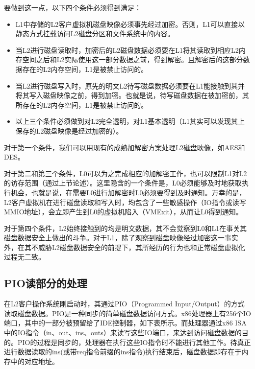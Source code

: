 要做到这一点，以下四个条件必须得到满足：

\begin{itemize}
\item{L1中存储的L2客户虚拟机磁盘映像必须事先经过加密。否则，L1可以直接以静态方式挂载访问L2磁盘分区和文件系统中的内容。}
\item{当L2进行磁盘读取时，加密后的L2磁盘数据必须要在L1将其读取到相应L2内存空间之后和L2实际使用这一部分数据之前，得到解密。且解密后的这部分数据存在的L2内存空间，L1是被禁止访问的。}
\item{当L2进行磁盘写入时，原先的明文L2待写磁盘数据必须要在L1能接触到其并将其写入磁盘映像之前，得到加密。也就是说，待写磁盘数据在被加密前，其所存在的L2内存空间，L1是被禁止访问的。}
\item{以上三个条件必须做到对L2完全透明，对L1基本透明（L1其实可以发现其上保存的L2磁盘映像是经过加密的）。}
\end{itemize}

对于第一个条件，我们可以用现有的成熟加解密方案处理L2磁盘映像，如AES和DES。

对于第二和第三个条件，L0可以为之完成相应的加解密工作，也可以限制L1对L2的访存范围（通过上节论述）。这里隐含的一个条件是，L0必须能够及时地获取执行机会，也就是说，在需要L0进行加解密时L0必须要得到及时通知。万幸的是，L2客户虚拟机在进行磁盘读取和写入时，均包含了一些敏感操作（IO指令或读写MMIO地址），会立即产生到L0的虚拟机陷入（VMExit），从而让L0得到通知。

对于第四个条件，L2始终接触到的均是明文数据，其不会觉察到L0和L1在事关其磁盘数据安全上做出的斗争。对于L1，除了观察到磁盘映像经过加密这一事实外，在其不威胁L2磁盘数据安全的前提下，其所经历的行为也和正常磁盘虚拟化过程无二致。


\subsection{PIO读部分的处理}

在L2客户操作系统刚启动时，其通过PIO（Programmed Input/Output）的方式读取磁盘数据。PIO是一种同步的简单磁盘数据访问方式。x86处理器上有256个IO端口，其中的一部分被预留给了IDE控制器，如下表所示。而处理器通过x86 ISA中的IO指令（in、out、ins、outs）来读写这些IO端口，来达到访问磁盘数据的目的。PIO的过程是同步的，处理器在执行这些IO指令时不能进行其他工作。待真正进行数据读取的ins(或带req指令前缀的ins指令)执行结束后，磁盘数据即存在于内存中的对应地址。

